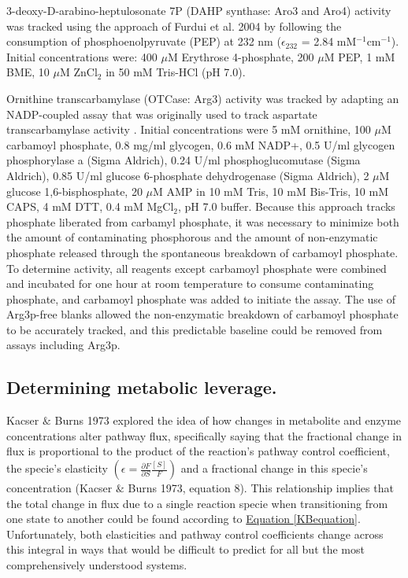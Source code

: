 3-deoxy-D-arabino-heptulosonate 7P (DAHP synthase: Aro3 and Aro4) activity was tracked using the approach of Furdui et al. 2004 \cite{Furdui:2004bk} by following the consumption of phosphoenolpyruvate (PEP) at 232 nm ($\epsilon_{232}$ = 2.84 mM$^{-1}$cm$^{-1}$). Initial concentrations were: 400 $\mu$M Erythrose 4-phosphate, 200 $\mu$M PEP, 1 mM BME, 10 $\mu$M ZnCl$_{2}$ in 50 mM Tris-HCl (pH 7.0).  

Ornithine transcarbamylase (OTCase: Arg3) activity was tracked by adapting an NADP-coupled assay that was originally used to track aspartate transcarbamylase activity \cite{Foote:1981to}. Initial concentrations were 5 mM ornithine, 100 $\mu$M carbamoyl phosphate, 0.8 mg/ml glycogen, 0.6 mM NADP+, 0.5 U/ml glycogen phosphorylase a (Sigma Aldrich), 0.24 U/ml phosphoglucomutase (Sigma Aldrich), 0.85 U/ml glucose 6-phosphate dehydrogenase (Sigma Aldrich), 2 $\mu$M glucose 1,6-bisphosphate, 20 $\mu$M AMP in 10 mM Tris, 10 mM Bis-Tris, 10 mM CAPS, 4 mM DTT, 0.4 mM MgCl$_{2}$, pH 7.0 buffer.  Because this approach tracks phosphate liberated from carbamyl phosphate, it was necessary to minimize both the amount of contaminating phosphorous and the amount of non-enzymatic phosphate released through the spontaneous breakdown of carbamoyl phosphate.  To determine activity, all reagents except carbamoyl phosphate were combined and incubated for one hour at room temperature to consume contaminating phosphate, and carbamoyl phosphate was added to initiate the assay.  The use of Arg3p-free blanks allowed the non-enzymatic breakdown of carbamoyl phosphate to be accurately tracked, and this predictable baseline could be removed from assays including Arg3p. 

\subsection*{Determining metabolic leverage.}

Kacser $\&$ Burns 1973 \cite{Kacser:1973fe} explored the idea of how changes in metabolite and enzyme concentrations alter pathway flux, specifically saying that the fractional change in flux is proportional to the product of the reaction's pathway control coefficient, the specie's elasticity $\left(\epsilon = \frac{\partial F}{\partial S}\frac{[S]}{F}\right)$ and a fractional change in this specie's concentration (Kacser $\&$ Burns 1973, equation 8).  This relationship implies that the total change in flux due to a single reaction specie when transitioning from one state to another could be found according to \hyperref[KBequation]{Equation \ref{KBequation}}.  Unfortunately, both elasticities and pathway control coefficients change across this integral in ways that would be difficult to predict for all but the most comprehensively understood systems.

